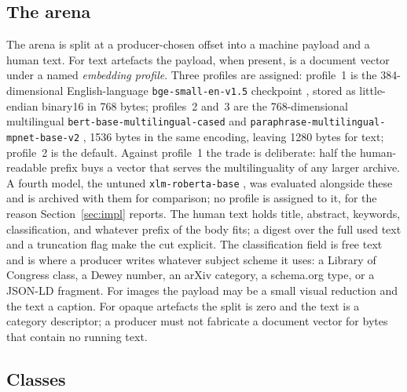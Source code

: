 \documentclass[11pt]{article}
\begin{document}
\subsection{The arena}

The arena is split at a producer-chosen offset into a machine payload and a
human text. For text artefacts the payload, when present, is a document vector
under a named \emph{embedding profile}. Three profiles are assigned:
profile~1 is the 384-dimensional English-language \nolinkurl{bge-small-en-v1.5}
checkpoint \citep{BAAI:2023,Xiao:2023}, stored as little-endian binary16 in
768 bytes; profiles~2 and~3 are the 768-dimensional multilingual
\nolinkurl{bert-base-multilingual-cased} \citep{Google:2019,Devlin:2019} and
\nolinkurl{paraphrase-multilingual-mpnet-base-v2} \citep{Reimers:2021,Reimers:2020},
1536 bytes in the same encoding, leaving 1280 bytes for text; profile~2 is
the default. Against profile~1 the trade is deliberate: half the
human-readable prefix buys a vector that serves the multilinguality of any
larger archive. A fourth model, the untuned \nolinkurl{xlm-roberta-base}
\citep{FacebookAI:2019,Conneau:2020b}, was evaluated alongside these and is
archived with them for comparison; no profile is assigned to it, for the
reason Section~\ref{sec:impl} reports. The human text holds title, abstract,
keywords, classification, and whatever prefix of the body fits; a digest over
the full used text and a truncation flag make the cut explicit. The
classification field is free text and is where a producer writes whatever
subject scheme it uses: a Library of Congress class, a Dewey number, an arXiv
category, a schema.org type, or a JSON-LD fragment. For images the payload may
be a small visual reduction and the text a caption. For opaque artefacts the
split is zero and the text is a category descriptor; a producer must not
fabricate a document vector for bytes that contain no running text.

\subsection{Classes}
\label{sec:classes}
\end{document}
